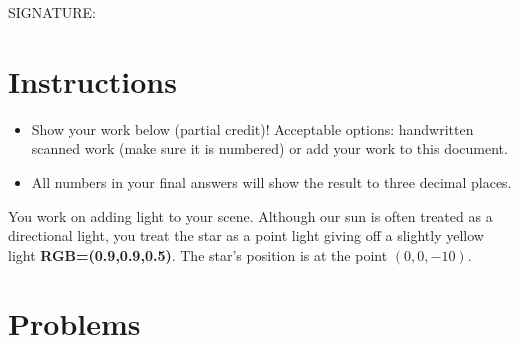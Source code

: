 \documentclass{article}
\begin{document}
\begin{titlepage}
\noindent
SIGNATURE: \textunderscore \textunderscore \textunderscore \textunderscore\textunderscore \textunderscore \textunderscore \textunderscore\textunderscore \textunderscore \textunderscore \textunderscore\textunderscore \textunderscore \textunderscore \textunderscore\textunderscore \textunderscore \textunderscore \textunderscore\textunderscore \textunderscore \textunderscore \textunderscore\textunderscore \textunderscore \textunderscore \textunderscore\textunderscore \textunderscore \textunderscore \textunderscore\textunderscore \textunderscore \textunderscore \textunderscore\textunderscore \textunderscore \textunderscore \textunderscore\textunderscore \textunderscore \textunderscore \textunderscore\textunderscore \textunderscore \textunderscore \textunderscore\textunderscore \textunderscore \textunderscore \textunderscore\textunderscore \textunderscore \textunderscore \textunderscore\textunderscore \textunderscore \textunderscore \textunderscore\textunderscore \textunderscore \textunderscore \textunderscore\textunderscore \textunderscore \textunderscore \textunderscore\textunderscore \textunderscore \textunderscore \textunderscore\textunderscore \textunderscore \textunderscore \textunderscore\textunderscore  
\end{titlepage}


\maketitle



\section*{Instructions}
\begin{itemize}
    \item Show your work below (partial credit)! Acceptable options: handwritten scanned work (make sure it is numbered) or add your work to this document.
    \item All numbers in your final answers will show the result to three decimal places.
\end{itemize}

You work on adding light to your scene. Although our sun is often treated as a directional light, you treat the star as a point light giving off a slightly yellow light \textbf{RGB=(0.9,0.9,0.5)}. The star’s position is at the point \((0, 0, -10)\).

\section*{Problems}
\end{document}
